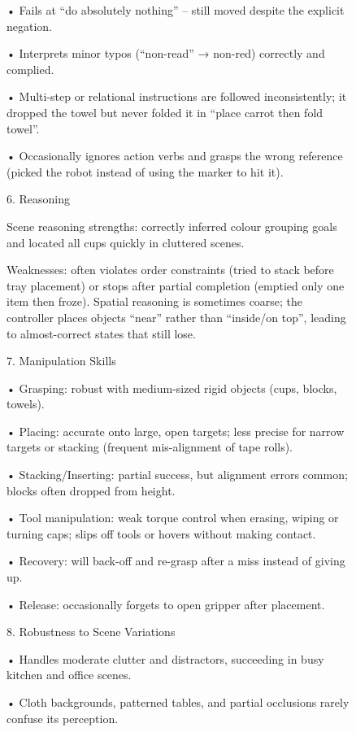 \begin{figure}[ht!]
{\begin{minipage}{\linewidth}
• Fails at “do absolutely nothing” – still moved despite the explicit negation. \par
• Interprets minor typos (“non-read” → non-red) correctly and complied.  \par
• Multi-step or relational instructions are followed inconsistently; it dropped the towel but never folded it in “place carrot then fold towel”.  \par
• Occasionally ignores action verbs and grasps the wrong reference (picked the robot instead of using the marker to hit it). \par
\vspace{1em}
6. Reasoning  \par
Scene reasoning strengths: correctly inferred colour grouping goals and located all cups quickly in cluttered scenes.  \par
Weaknesses: often violates order constraints (tried to stack before tray placement) or stops after partial completion (emptied only one item then froze).  Spatial reasoning is sometimes coarse; the controller places objects “near” rather than “inside/on top”, leading to almost-correct states that still lose. \par
\vspace{1em}
7. Manipulation Skills \par
• Grasping: robust with medium-sized rigid objects (cups, blocks, towels).  \par
• Placing: accurate onto large, open targets; less precise for narrow targets or stacking (frequent mis-alignment of tape rolls).  \par
• Stacking/Inserting: partial success, but alignment errors common; blocks often dropped from height.  \par
• Tool manipulation: weak torque control when erasing, wiping or turning caps; slips off tools or hovers without making contact.  \par
• Recovery: will back-off and re-grasp after a miss instead of giving up.  \par
• Release: occasionally forgets to open gripper after placement. \par
\vspace{1em}
8. Robustness to Scene Variations  \par
• Handles moderate clutter and distractors, succeeding in busy kitchen and office scenes.  \par
• Cloth backgrounds, patterned tables, and partial occlusions rarely confuse its perception.  \par

\end{minipage}}
\end{figure}
